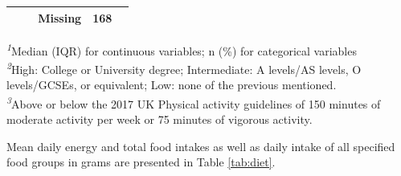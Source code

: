 \documentclass[nutrients,article,submit,moreauthors,pdftex]{Definitions/mdpi}
\begin{document}
\begin{table}[t]
\begin{tabular*}{1\linewidth}{@{\extracolsep{\fill}}lcc}
    Missing & 168 &  \\ 
\bottomrule
\end{tabular*}
\begin{minipage}{\linewidth}
\textsuperscript{\textit{1}}Median (IQR) for continuous variables; n (\%) for categorical variables\\
\textsuperscript{\textit{2}}High: College or University degree;
Intermediate: A levels/AS levels, O levels/GCSEs, or equivalent;
Low: none of the previous mentioned.\\
\textsuperscript{\textit{3}}Above or below the 2017 UK Physical activity guidelines of 150 minutes of moderate activity per week or 75 minutes of vigorous activity.\\
\end{minipage}
\end{table}

Mean daily energy and total food intakes as well as daily intake of all
specified food groups in grams are presented in Table \ref{tab:diet}.
\end{document}
